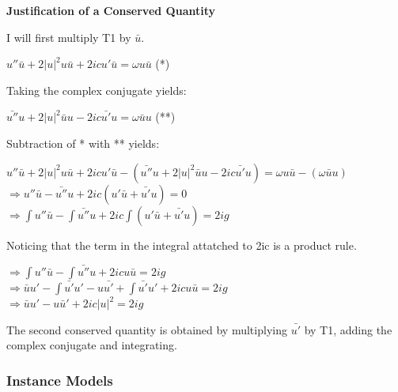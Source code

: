 \documentclass[12pt]{article}
\begin{document}
\begin{center}
	\newpage
	\begin{flushleft}
		\textbf{Justification of a Conserved Quantity}
	\end{flushleft} 
	
\end{center} 

I will first multiply T1 by $\bar{u}$. \\ 
\begin{center}
$  u''\bar{u} + 2|u|^{2}u \bar{u}+2icu' \bar{u}=\omega u \bar{u}$ (*) \\ 
\end{center}
Taking the complex conjugate yields: \\ 
\begin{center}
$ \bar{u''} u + 2|u|^{2} \bar{u} u -2ic\bar{u'}u = \omega \bar{u} u$ (**) \\ 
\end{center} 
Subtraction of * with ** yields: \\ 
\begin{center} 
$  u''\bar{u} + 2|u|^{2}u \bar{u}+2icu' \bar{u} - (\bar{u''} u + 2|u|^{2} 
\bar{u} u -2ic\bar{u'}u) =\omega u \bar{u} - (\omega \bar{u} u)$\\ 
$ \Rightarrow  u''\bar{u} - \bar{u''} u + 2ic (u' \bar{u} + \bar{u'}u ) = 0$ \\
$ \Rightarrow \int u''\bar{u} - \int \bar{u''} u + 2ic \int (u' \bar{u} + 
\bar{u'}u ) = 2ig  $ \\  
\end{center} 
Noticing that the term in the integral attatched  to 2ic is a product rule.\\ 
\begin{center}
$ \Rightarrow \int u''\bar{u} - \int \bar{u''} u + 2icu \bar{u} = 2ig $ \\
$ \Rightarrow \bar{u}u' - \int \bar{u'} u' - u \bar{u'} + \int \bar{u'} u' + 
2icu \bar{u} = 2ig$ \\ 
$ \Rightarrow \bar{u}u' - u\bar{u}' + 2ic|u|^{2} = 2ig$ \\ 
\end{center} 
The second conserved quantity is obtained by multiplying $\bar{u'}$ by T1, 
adding the complex conjugate and integrating.  

\subsubsection{Instance Models} \label{sec_instance}    
\end{document}
